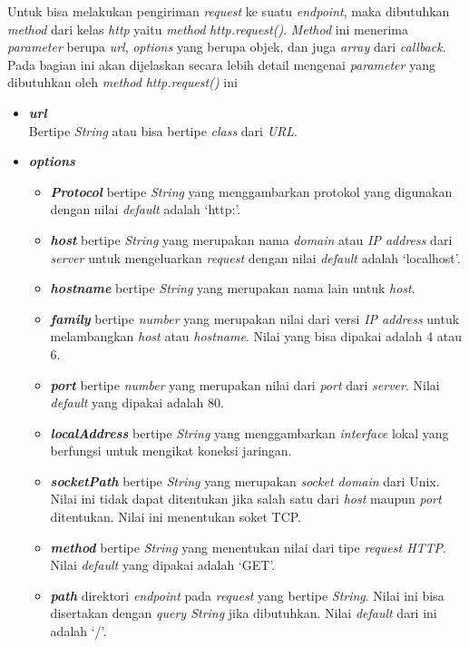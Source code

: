 Untuk bisa melakukan pengiriman \textit{request} ke suatu \textit{endpoint}, maka dibutuhkan \textit{method} dari kelas \textit{http} yaitu \textit{method} \textit{http.request()}. \textit{Method} ini menerima \textit{parameter} berupa \textit{url}, \textit{options} yang berupa objek, dan juga \textit{array} dari \textit{callback}. Pada bagian ini akan dijelaskan secara lebih detail mengenai \textit{parameter} yang dibutuhkan oleh \textit{method} \textit{http.request()} ini
\begin{itemize}
	\item \textbf{\textit{url}}\\
	Bertipe \textit{String} atau bisa bertipe \textit{class} dari \textit{URL}. 
	\item \textbf{\textit{options}}
	\begin{itemize}
		\item \textbf{\textit{Protocol}} bertipe \textit{String} yang menggambarkan protokol yang digunakan dengan nilai \textit{default} adalah `http:'. 
		\item \textbf{\textit{host}} bertipe \textit{String} yang merupakan nama \textit{domain} atau \textit{IP address} dari \textit{server} untuk mengeluarkan \textit{request} dengan nilai \textit{default} adalah `localhost'. 
		\item \textbf{\textit{hostname}} bertipe \textit{String} yang merupakan nama lain untuk \textit{host}.
		\item \textbf{\textit{family}} bertipe \textit{number} yang merupakan nilai dari versi \textit{IP address} untuk melambangkan \textit{host} atau \textit{hostname}. Nilai yang bisa dipakai adalah 4 atau 6. 
		\item \textbf{\textit{port}} bertipe \textit{number} yang merupakan nilai dari \textit{port} dari \textit{server}. Nilai \textit{default} yang dipakai adalah 80. 
		\item \textbf{\textit{localAddress}} bertipe \textit{String} yang menggambarkan \textit{interface} lokal yang berfungsi untuk mengikat koneksi jaringan. 
		\item \textbf{\textit{socketPath}} bertipe \textit{String} yang merupakan \textit{socket domain} dari Unix. Nilai ini tidak dapat ditentukan jika salah satu dari \textit{host} maupun \textit{port} ditentukan. Nilai ini menentukan soket TCP. 
		\item \textbf{\textit{method}} bertipe \textit{String} yang menentukan nilai dari tipe \textit{request HTTP}. Nilai \textit{default} yang dipakai adalah `GET'. 
		\item \textbf{\textit{path}} direktori \textit{endpoint} pada \textit{request} yang bertipe \textit{String}. Nilai ini bisa disertakan dengan \textit{query String} jika dibutuhkan. Nilai \textit{default} dari ini adalah `/'. 

\end{itemize}
\end{itemize}
